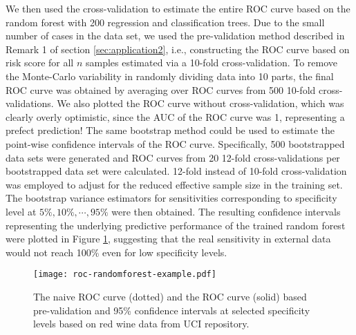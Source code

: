 \documentclass[12pt]{article}
\begin{document}
We then used the cross-validation to estimate the entire ROC curve based on the random forest with 200 regression and classification trees. Due to the small number of cases in the data set, we used the pre-validation method described in Remark 1 of section \ref{sec:application2}, i.e.,  constructing the ROC curve based on risk score for all $n$ samples estimated via a 10-fold cross-validation.  To remove the Monte-Carlo variability in randomly dividing data into 10 parts, the final ROC curve was obtained by averaging over ROC curves from 500 10-fold cross-validations.  We also plotted the ROC curve without cross-validation, which was clearly overly optimistic, since the AUC of the ROC curve was 1, representing a prefect prediction!  The same bootstrap method could be used to estimate the point-wise confidence intervals of the ROC curve. Specifically, 500 bootstrapped data sets were generated and ROC curves from 20 12-fold cross-validations per bootstrapped data set were calculated. 12-fold instead of 10-fold cross-validation was employed to adjust for the reduced effective sample size in the training set. The bootstrap variance estimators for sensitivities corresponding to specificity level at $5\%, 10\%, \cdots, 95\%$ were then obtained. The resulting confidence intervals representing the underlying predictive performance of the trained random forest were plotted in Figure \ref{fig:roc}, suggesting that the real sensitivity in external data would not reach 100\% even for low specificity levels.


\begin{figure}
\centering
\texttt{[image: roc-randomforest-example.pdf]}
\caption{The naive ROC curve (dotted) and the ROC curve (solid) based pre-validation and 95\% confidence intervals at selected specificity levels based on red wine data from UCI repository. }
\label{fig:roc}
\end{figure}
\end{document}
